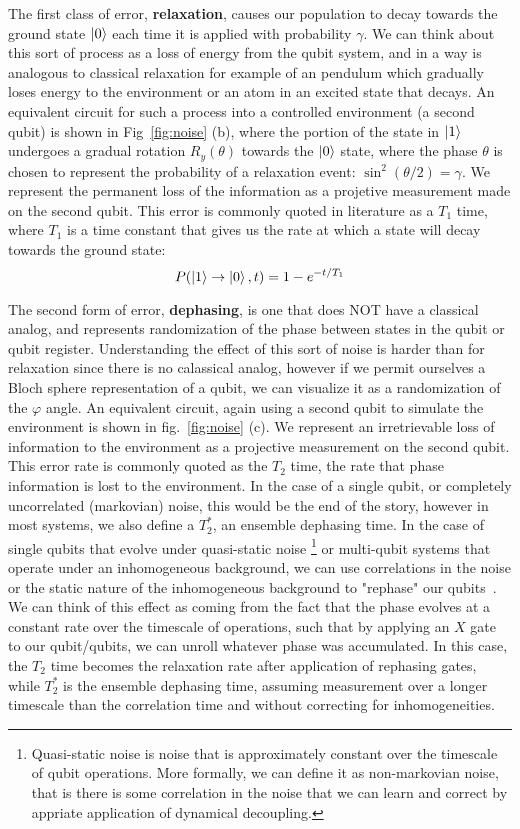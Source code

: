 The first class of error, \textbf{relaxation}, causes our population to decay towards the ground state $\ket{0}$ each time it is
applied with probability $\gamma$. We can think about this sort of process as a loss of energy from the qubit system, and
in a way is analogous to classical relaxation for example of an pendulum which gradually loses energy to the environment
or an atom in an excited state that decays. An equivalent circuit for such a process into a controlled environment (a second qubit) is
shown in Fig~\ref{fig:noise} (b), where the portion of the state in $\ket{1}$ undergoes a gradual rotation $R_{y}(\theta)$
towards the $\ket{0}$ state, where the phase $\theta$ is chosen to represent the probability of a relaxation event:
$\sin^2(\theta/2) = \gamma$. We represent the permanent loss of the information as a projetive measurement made on the
second qubit. This error is commonly quoted in literature as a $T_1$ time, where $T_1$ is a time constant
that gives us the rate at which a state will decay towards the ground state:
\begin{equation}
  P(\ket{1} \rightarrow \ket{0}, t) = 1 - e^{-t/T_1}
\end{equation}

The second form of error, \textbf{dephasing}, is one that does NOT have a classical analog, and represents randomization of the phase between
states in the qubit or qubit register. Understanding the effect of this sort of noise is harder than for relaxation since there is no
calassical analog, however if we permit ourselves a Bloch sphere representation of a qubit, we can visualize it
as a randomization of the $\varphi$ angle. An equivalent circuit, again using a second qubit to simulate the
environment is shown in fig.~\ref{fig:noise} (c). We represent an irretrievable loss of information to the
environment as a projective measurement on the second qubit. This error rate is commonly quoted as the $T_2$ time,
the rate that phase information is lost to the environment. In the case of a single qubit, or completely uncorrelated
(markovian) noise, this would be the end of the story, however in most systems, we also define a $T_2^*$, an ensemble
dephasing time. In the case of single qubits that evolve under quasi-static noise
\footnote{Quasi-static noise is noise that is approximately constant over the timescale of qubit operations. More formally,
we can define it as non-markovian noise, that is there is some correlation in the noise that we can learn and correct
by appriate application of dynamical decoupling.} or multi-qubit systems that operate
under an inhomogeneous background, we can use correlations in the noise or the static nature of the inhomogeneous background
to "rephase" our qubits~\cite{PhysRev.80.580,dynamic-decoupling-biercuk}. We can think of this effect as coming from the
fact that the phase evolves at a constant rate over the timescale of operations, such that by applying an $X$ gate to our
qubit/qubits, we can unroll whatever phase was accumulated.  In this case, the $T_2$ time becomes the relaxation rate after
application of rephasing gates, while $T_2^*$ is the ensemble dephasing time, assuming measurement over a longer timescale
than the correlation time and without correcting for inhomogeneities.

